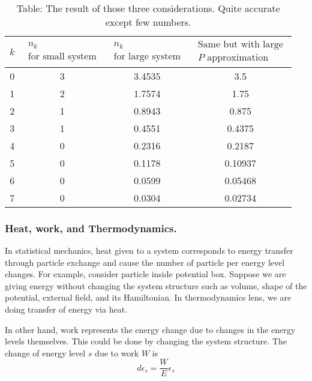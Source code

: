 \documentclass[../../../Main.tex]{subfiles}
\begin{document}
\begin{table}[h]
    \centering
    \caption*{Table: The result of those three considerations. Quite accurate except few numbers.}
    \begin{tabular}{cccc} 
        \toprule
        $k$&$\begin{array}{c}
            n_k\\
            \text{for small system}
        \end{array}$ &$\begin{array}{c}
            n_k\\
            \text{for large system}
        \end{array}$ &$\begin{array}{c}
            \text{Same but with large}\\
            P\text{ approximation}
        \end{array}$\\ 
        \midrule
        0 &3&3.4535&3.5 \\
        1 &2&1.7574&1.75 \\
        2 &1&0.8943&0.875 \\
        3 &1&0.4551&0.4375 \\
        4 &0&0.2316&0.2187 \\
        5 &0&0.1178&0.10937 \\
        6 &0&0.0599&0.05468 \\
        7 &0&0.0304&0.02734 \\
        \bottomrule
    \end{tabular}
\end{table}

\subsubsection*{Heat, work, and Thermodynamics.} In statistical mechanics, heat given to a system corresponds to energy transfer through particle exchange and cause the number of particle per energy level changes. For example, consider particle inside potential box. Suppose we are giving energy without changing the system structure such as volume, shape of the potential, external field, and its Hamiltonian. In thermodynamics lens, we are doing transfer of energy via heat. 

In other hand, work represents the energy change due to changes in the energy levels themselves. This could be done by  changing the system structure. The change of energy level $s$ due to work $W$ is 
\begin{equation*}
    d\epsilon_s=\frac{W}{E}\epsilon_s
\end{equation*}
\end{document}
